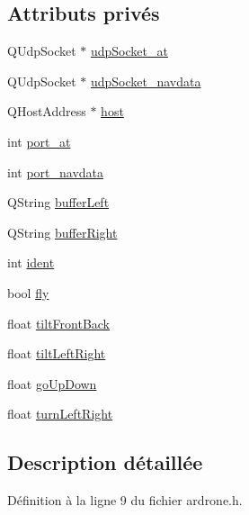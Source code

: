 \subsection*{Attributs privés}
\begin{DoxyCompactItemize}
\item 
Q\-Udp\-Socket $\ast$ \hyperlink{class_a_r_drone_ad782b7e11364e26df56385c91c77dca5}{udp\-Socket\-\_\-at}
\item 
Q\-Udp\-Socket $\ast$ \hyperlink{class_a_r_drone_ac4bc7a85d5b0ad4ed7631d37fed1304e}{udp\-Socket\-\_\-navdata}
\item 
Q\-Host\-Address $\ast$ \hyperlink{class_a_r_drone_abe1f9338191b05ef8ba8db9340b9c43f}{host}
\item 
int \hyperlink{class_a_r_drone_a573c1ae46b8facf60d0abb94ea4cdb64}{port\-\_\-at}
\item 
int \hyperlink{class_a_r_drone_a077d0256466bb8b40a5739a6d556bddf}{port\-\_\-navdata}
\item 
Q\-String \hyperlink{class_a_r_drone_aae2300ce3535a758fd413b27d998a3e2}{buffer\-Left}
\item 
Q\-String \hyperlink{class_a_r_drone_aa865842de35bdb04ffa21805d4c4c9c4}{buffer\-Right}
\item 
int \hyperlink{class_a_r_drone_a4ad30308ac96408493b6dbe426281c42}{ident}
\item 
bool \hyperlink{class_a_r_drone_abf1aad9db871e16087c3529814287b96}{fly}
\item 
float \hyperlink{class_a_r_drone_a674129a2cb1f57f285fcb75b3ccfe196}{tilt\-Front\-Back}
\item 
float \hyperlink{class_a_r_drone_ae9442e072e260cf4e216849561cedfe7}{tilt\-Left\-Right}
\item 
float \hyperlink{class_a_r_drone_a10e045b2d41b960d6029f8ac1509eb90}{go\-Up\-Down}
\item 
float \hyperlink{class_a_r_drone_a2e5ccfe94f6112399641f0cf0d97231e}{turn\-Left\-Right}
\end{DoxyCompactItemize}


\subsection{Description détaillée}


Définition à la ligne 9 du fichier ardrone.\-h.



